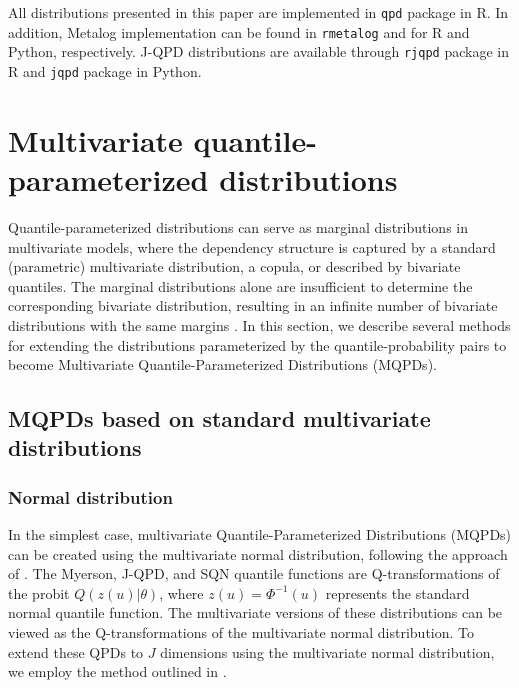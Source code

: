 \documentclass[
  fleqn,
  deca,
  blindrev
]{informs4}
\begin{document}
\textcolor[HTML]{ff0000}{All distributions presented in this paper are
implemented in \texttt{qpd} package
\citep{perepolkin2019QpdToolsQuantileparameterized} in R. In addition,
Metalog implementation can be found in \texttt{rmetalog}
\citep{faber2021RmetalogMetalogDistribution} and
\citep{smith2021PymetalogPythonMetalog} for R and Python, respectively.
J-QPD distributions are available through \texttt{rjqpd} package
\citep{ingram2020RjqpdJohnsonQuantileparameterised} in R and
\texttt{jqpd} package \citep{khan2020JqpdPythonJQPD} in Python.}

\section{Multivariate quantile-parameterized
distributions}\label{sec-multivariateqpd}

Quantile-parameterized distributions can serve as marginal distributions
in multivariate models, where the dependency structure is captured by a
standard (parametric) multivariate distribution, a copula, or described
by bivariate quantiles. The marginal distributions alone are
insufficient to determine the corresponding bivariate distribution,
resulting in an infinite number of bivariate distributions with the same
margins
\citep{gumbel1960BivariateExponentialDistributions, gumbel1961BivariateLogisticDistributions}.
In this section, we describe several methods for extending the
distributions parameterized by the quantile-probability pairs to become
Multivariate Quantile-Parameterized Distributions (MQPDs).

\subsection{MQPDs based on standard multivariate
distributions}\label{mqpds-based-on-standard-multivariate-distributions}

\subsubsection{Normal distribution}\label{normal-distribution}

In the simplest case, multivariate Quantile-Parameterized Distributions
(MQPDs) can be created using the multivariate normal distribution,
following the approach of \citet{hoff2007ExtendingRankLikelihood}. The
Myerson, J-QPD, and SQN quantile functions are Q-transformations of the
probit \(Q(z(u)\vert\theta)\), where \(z(u)=\Phi^{-1}(u)\) represents
the standard normal quantile function. The multivariate versions of
these distributions can be viewed as the Q-transformations of the
multivariate normal distribution. To extend these QPDs to \(J\)
dimensions using the multivariate normal distribution, we employ the
method outlined in \citet{drovandi2011LikelihoodfreeBayesianEstimation}.
\end{document}
